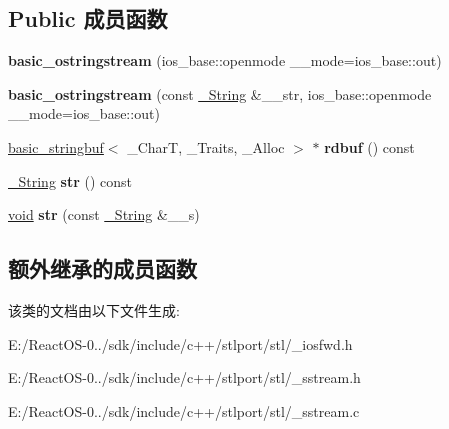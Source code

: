 \subsection*{Public 成员函数}
\begin{DoxyCompactItemize}
\item 
\mbox{\label{classbasic__ostringstream_af9393303241f648366f9374149540b34}} 
{\bfseries basic\+\_\+ostringstream} (ios\+\_\+base\+::openmode \+\_\+\+\_\+mode=ios\+\_\+base\+::out)
\item 
\mbox{\label{classbasic__ostringstream_ae3ec76c6ec2042ca814aefc0b840dfb7}} 
{\bfseries basic\+\_\+ostringstream} (const \hyperlink{classbasic__string}{\+\_\+\+String} \&\+\_\+\+\_\+str, ios\+\_\+base\+::openmode \+\_\+\+\_\+mode=ios\+\_\+base\+::out)
\item 
\mbox{\label{classbasic__ostringstream_a1110d5ccc0a630c1caf5e2b7646bb06d}} 
\hyperlink{classbasic__stringbuf}{basic\+\_\+stringbuf}$<$ \+\_\+\+CharT, \+\_\+\+Traits, \+\_\+\+Alloc $>$ $\ast$ {\bfseries rdbuf} () const
\item 
\mbox{\label{classbasic__ostringstream_a1ce551033ec800eb5f5c5aea76657e1f}} 
\hyperlink{classbasic__string}{\+\_\+\+String} {\bfseries str} () const
\item 
\mbox{\label{classbasic__ostringstream_a145fb32642644d99793fd7278ca4e230}} 
\hyperlink{interfacevoid}{void} {\bfseries str} (const \hyperlink{classbasic__string}{\+\_\+\+String} \&\+\_\+\+\_\+s)
\end{DoxyCompactItemize}
\subsection*{额外继承的成员函数}


该类的文档由以下文件生成\+:\begin{DoxyCompactItemize}
\item 
E\+:/\+React\+O\+S-\/0../sdk/include/c++/stlport/stl/\+\_\+iosfwd.\+h\item 
E\+:/\+React\+O\+S-\/0../sdk/include/c++/stlport/stl/\+\_\+sstream.\+h\item 
E\+:/\+React\+O\+S-\/0../sdk/include/c++/stlport/stl/\+\_\+sstream.\+c\end{DoxyCompactItemize}
